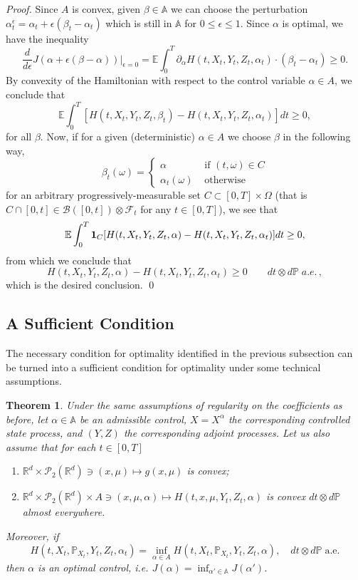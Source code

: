 \documentclass[11pt]{amsart}
\newtheorem{theorem}{Theorem}[section]
\begin{document}
\vskip 2pt\noindent\emph{Proof. }
Since $A$ is convex, given $\beta\in{\mathbb A}$ we can choose the perturbation $\alpha^\epsilon_t=\alpha_t+\epsilon (\beta_t-\alpha_t)$
which is still in ${\mathbb A}$ for $0\le \epsilon\le 1$. Since $\alpha$ is optimal, we have the inequality
$$
\frac{d}{d\epsilon}J(\alpha+\epsilon(\beta-\alpha))\big|_{\epsilon=0}={\mathbb E}\int_0^T\partial_\alpha H(t,X_t,Y_t,Z_t,\alpha_t)\cdot (\beta_t-\alpha_t)\ge 0.
$$
By convexity of the Hamiltonian with respect to the control variable $\alpha\in A$, we conclude that
$$
{\mathbb E}\int_0^T[H(t,X_t,Y_t,Z_t,\beta_t)- H(t,X_t,Y_t,Z_t,\alpha_t)]dt\ge 0, 
$$
for all $\beta$. Now, if for a given (deterministic) $\alpha\in A$ we choose $\beta$ in the following way, 
$$
\beta_t(\omega)
= \begin{cases}
\alpha&\text{ if } (t,\omega)\in C\\
\alpha_t(\omega)&\text{ otherwise}
\end{cases}
$$
for an arbitrary progressively-measurable set $C\subset [0,T]\times\Omega$ (that is $C \cap [0,t] \in {\mathcal B}([0,t]) \otimes {\mathcal F}_{t}$ for any $t \in [0,T]$), we see that
$$
{\mathbb E}\int_0^T{\bf 1}_C[H(t,X_t,Y_t,Z_t,\alpha)- H(t,X_t,Y_t,Z_t,\alpha_t)]dt\ge 0,
$$
from which we conclude that
$$
H(t,X_t,Y_t,Z_t,\alpha)- H(t,X_t,Y_t,Z_t,\alpha_t) \ge 0 \qquad dt\otimes d{\mathbb P} \;a.e. \, ,
$$
which is the desired conclusion.
\qed

\subsection{\textbf{A Sufficient Condition}}
The necessary condition for optimality identified in the previous subsection can be turned into a sufficient condition for optimality under some technical assumptions.

\begin{theorem}
\label{th:pontryagin}
Under the same assumptions of regularity on the coefficients as before, let $\alpha\in{\mathbb A}$ be an admissible control, $ X= X^{\alpha}$ the corresponding controlled state process, and $( Y, Z)$ the corresponding adjoint processes.
Let us also assume that for each $t\in [0,T]$
\begin{enumerate}
\item ${\mathbb R}^d \times {\mathcal P}_{2}({\mathbb R}^d) \ni (x,\mu)\mapsto g(x,\mu)$ is convex;
\item ${\mathbb R}^d \times {\mathcal P}_{2}({\mathbb R}^d) \times A \ni (x,\mu,\alpha)\mapsto H(t,x,\mu,Y_t,Z_t,\alpha)$ is convex $dt\otimes d{\mathbb P}$ almost everywhere.
\end{enumerate} 
Moreover, if 
\begin{equation}
\label{fo:isaacs}
 H(t,X_t,{\mathbb P}_{X_t},Y_t,Z_t, \alpha_t)=\inf_{\alpha\in A}H(t,X_t,{\mathbb P}_{X_t},Y_t,Z_t,\alpha),\quad  dt\otimes d{\mathbb P} \;\text{a.e.}
 \end{equation}
then $\alpha$ is an optimal control, i.e.
$J(\alpha)=\inf_{ \alpha'\in{\mathbb A}}J( \alpha')
$. 
\end{theorem}
\end{document}
